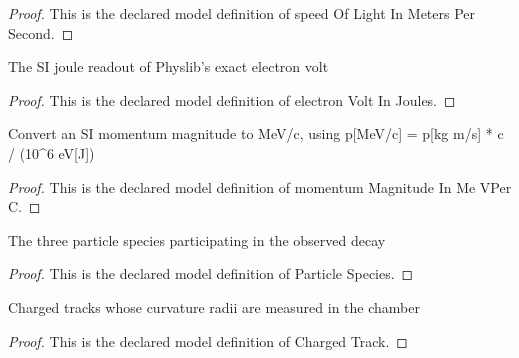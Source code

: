 \begin{proof}
  This is the declared model definition of speed Of Light In Meters Per Second.
\end{proof}
\begin{definition}
  \label{def:physics:phyx-mini-0540:phyxminiproblems-problemphyxmini0540-electronvoltinjoules}
  The SI joule readout of Physlib's exact electron volt
\end{definition}
\begin{proof}
  This is the declared model definition of electron Volt In Joules.
\end{proof}
\begin{definition}
  \label{def:physics:phyx-mini-0540:phyxminiproblems-problemphyxmini0540-momentummagnitudeinmevperc}
  Convert an SI momentum magnitude to MeV/c, using p[MeV/c] = p[kg m/s] * c / (10\textasciicircum{}6 eV[J])
\end{definition}
\begin{proof}
  This is the declared model definition of momentum Magnitude In Me VPer C.
\end{proof}
\begin{definition}
  \label{def:physics:phyx-mini-0540:phyxminiproblems-problemphyxmini0540-particlespecies}
  The three particle species participating in the observed decay
\end{definition}
\begin{proof}
  This is the declared model definition of Particle Species.
\end{proof}
\begin{definition}
  \label{def:physics:phyx-mini-0540:phyxminiproblems-problemphyxmini0540-chargedtrack}
  Charged tracks whose curvature radii are measured in the chamber
\end{definition}
\begin{proof}
  This is the declared model definition of Charged Track.
\end{proof}
